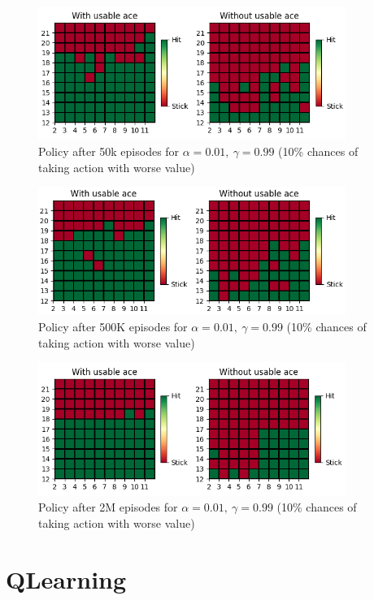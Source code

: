 \documentclass{article}
\begin{document}
\begin{figure}[h]
    \centering
    \includegraphics[width=10cm]{plots/sarsa_policy_50k.png}
    \caption{Policy after 50k episodes for $\alpha=0.01,\ \gamma=0.99$ (10\% chances of taking action with worse value)}
\end{figure}

\begin{figure}[h]
    \centering
    \includegraphics[width=10cm]{plots/sarsa_policy_500k.png}
    \caption{Policy after 500K episodes for $\alpha=0.01,\ \gamma=0.99$ (10\% chances of taking action with worse value)}
\end{figure}

\begin{figure}[h]
    \centering
    \includegraphics[width=10cm]{plots/sarsa_policy_4M.png}
    \caption{Policy after 2M episodes for $\alpha=0.01,\ \gamma=0.99$ (10\% chances of taking action with worse value)}
\end{figure}

\section{QLearning}
\end{document}
